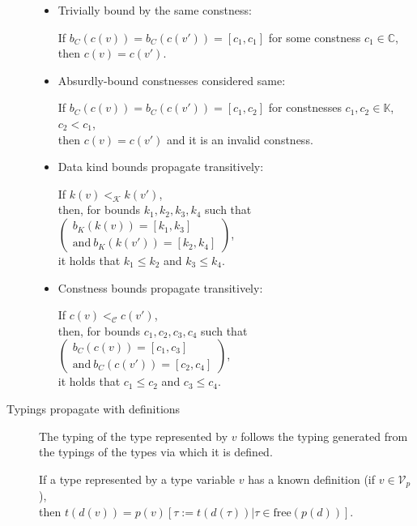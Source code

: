 \begin{description}
\begin{itemize}
            \item Trivially bound by the same constness:

            If $b_C (c (v)) = b_C (c (v')) = [c_1, c_1]$ for some constness $c_1 \in \mathbb{C}$, \\
            then $c (v) = c (v')$.

            \item Absurdly-bound constnesses considered same:

            If $b_C (c (v)) = b_C (c (v')) = [c_1, c_2]$ for constnesses $c_1, c_2 \in \mathbb{K}$, $c_2 < c_1$, \\
            then $c (v) = c (v')$ and it is an invalid constness.

            \item Data kind bounds propagate transitively:

            If $k (v) <_{\mathcal{K}} k (v')$, \\
            then, for bounds $k_1, k_2, k_3, k_4$ such that $
            \left(\begin{array}{r}b_K (k (v)) = [k_1, k_3] \\ \text{and}\ b_K (k (v')) = [k_2, k_4]\end{array}\right)$, \\
            it holds that $k_1 \leq k_2$ and $k_3 \leq k_4$.

            \item Constness bounds propagate transitively:

            If $c (v) <_{\mathcal{C}} c (v')$, \\
            then, for bounds $c_1, c_2, c_3, c_4$ such that $\left(\begin{array}{r}b_C (c (v)) = [c_1, c_3] \\\text{and}\ b_C (c (v')) = [c_2, c_4]\end{array}\right)$, \\
            it holds that $c_1 \leq c_2$ and $c_3 \leq c_4$.
        \end{itemize}

    \item[Typings propagate with definitions] The typing of the type represented by $v$ follows the typing generated from the typings of the types via which it is defined.

    If a type represented by a type variable $v$ has a known definition (if $v \in \mathcal{V}_p$), \\
    then $t (d (v)) = p(v) \left[ \tau := t (d (\tau)) | \tau \in \mathrm{free} (p (d))\right]$.
\end{description}

